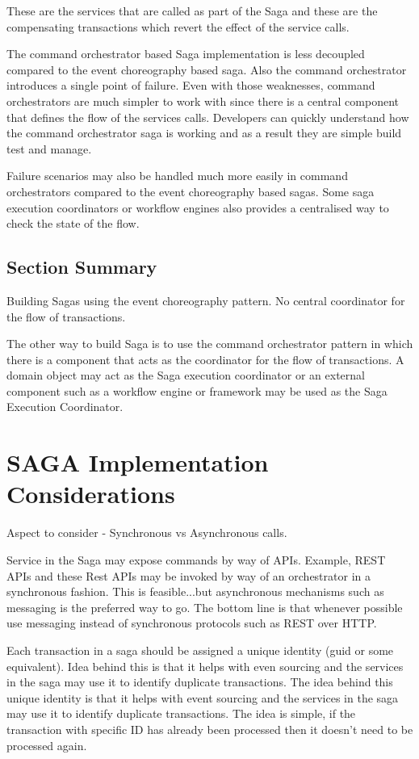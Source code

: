 These are the services that are called as part of the Saga and these are the compensating transactions which revert the effect of the service calls.

The command orchestrator based Saga implementation is less decoupled compared to the event choreography based saga.
Also the command orchestrator introduces a single point of failure.
Even with those weaknesses, command orchestrators are much simpler to work with since there is a central component that defines the flow of the services calls.
Developers can quickly understand how the command orchestrator saga is working and as a result they are simple build test and manage.

Failure scenarios may also be handled much more easily in command orchestrators compared to the event choreography based sagas.
Some saga execution coordinators or workflow engines also provides a centralised way to check the state of the flow.

\subsection{Section Summary}
Building Sagas using the event choreography pattern.
No central coordinator for the flow of transactions.

The other way to build Saga is to use the command orchestrator pattern in which there is a component that acts as the coordinator for the flow of transactions.
A domain object may act as the Saga execution coordinator or an external component such as a workflow engine or framework may be used as the Saga Execution Coordinator.

\section{SAGA Implementation Considerations}
Aspect to consider - Synchronous vs Asynchronous calls.

Service in the Saga may expose commands by way of APIs. Example, REST APIs and these Rest APIs may be invoked by way of an orchestrator in a synchronous fashion.
This is feasible...but asynchronous mechanisms such as messaging is the preferred way to go.
The bottom line is that whenever possible use messaging instead of synchronous protocols such as REST over HTTP.

Each transaction in a saga should be assigned a unique identity (guid or some equivalent).
Idea behind this is that it helps with even sourcing and the services in the saga may use it to identify duplicate transactions.
The idea behind this unique identity is that it helps with event sourcing and the services in the saga may use it to identify duplicate transactions.
The idea is simple, if the transaction with specific ID has already been processed then it doesn't need to be processed again.


